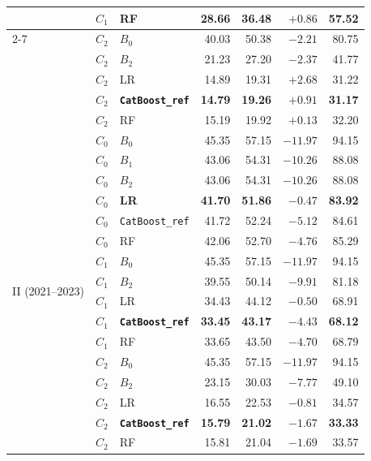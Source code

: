 \documentclass[11pt,a4paper]{article}
\begin{document}
\begin{table}[htbp]
\begin{tabular}{lllrrrr}
  & $C_1$ & RF                     & 28.66 & 36.48 & $+0.86$ & 57.52 \\
\cmidrule{2-7}
  & $C_2$ & $B_0$                  & 40.03 & 50.38 & $-2.21$ & 80.75 \\
  & $C_2$ & $B_2$                  & 21.23 & 27.20 & $-2.37$ & 41.77 \\
  & $C_2$ & LR                     & 14.89 & 19.31 & $+2.68$ & 31.22 \\
  & $C_2$ & \textbf{\texttt{CatBoost\_ref}} & \textbf{14.79} & \textbf{19.26} & $+0.91$ & \textbf{31.17} \\
  & $C_2$ & RF                     & 15.19 & 19.92 & $+0.13$ & 32.20 \\
\midrule
\multirow{16}{*}{II (2021--2023)}
  & $C_0$ & $B_0$                  & 45.35 & 57.15 & $-11.97$ & 94.15 \\
  & $C_0$ & $B_1$                  & 43.06 & 54.31 & $-10.26$ & 88.08 \\
  & $C_0$ & $B_2$                  & 43.06 & 54.31 & $-10.26$ & 88.08 \\
  & $C_0$ & \textbf{LR}            & \textbf{41.70} & \textbf{51.86} & $-0.47$ & \textbf{83.92} \\
  & $C_0$ & \texttt{CatBoost\_ref} & 41.72 & 52.24 & $-5.12$ & 84.61 \\
  & $C_0$ & RF                     & 42.06 & 52.70 & $-4.76$ & 85.29 \\
\cmidrule{2-7}
  & $C_1$ & $B_0$                  & 45.35 & 57.15 & $-11.97$ & 94.15 \\
  & $C_1$ & $B_2$                  & 39.55 & 50.14 & $-9.91$ & 81.18 \\
  & $C_1$ & LR                     & 34.43 & 44.12 & $-0.50$ & 68.91 \\
  & $C_1$ & \textbf{\texttt{CatBoost\_ref}} & \textbf{33.45} & \textbf{43.17} & $-4.43$ & \textbf{68.12} \\
  & $C_1$ & RF                     & 33.65 & 43.50 & $-4.70$ & 68.79 \\
\cmidrule{2-7}
  & $C_2$ & $B_0$                  & 45.35 & 57.15 & $-11.97$ & 94.15 \\
  & $C_2$ & $B_2$                  & 23.15 & 30.03 & $-7.77$ & 49.10 \\
  & $C_2$ & LR                     & 16.55 & 22.53 & $-0.81$ & 34.57 \\
  & $C_2$ & \textbf{\texttt{CatBoost\_ref}} & \textbf{15.79} & \textbf{21.02} & $-1.67$ & \textbf{33.33} \\
  & $C_2$ & RF                     & 15.81 & 21.04 & $-1.69$ & 33.57 \\
\bottomrule
\end{tabular}
\end{table}
\end{document}
